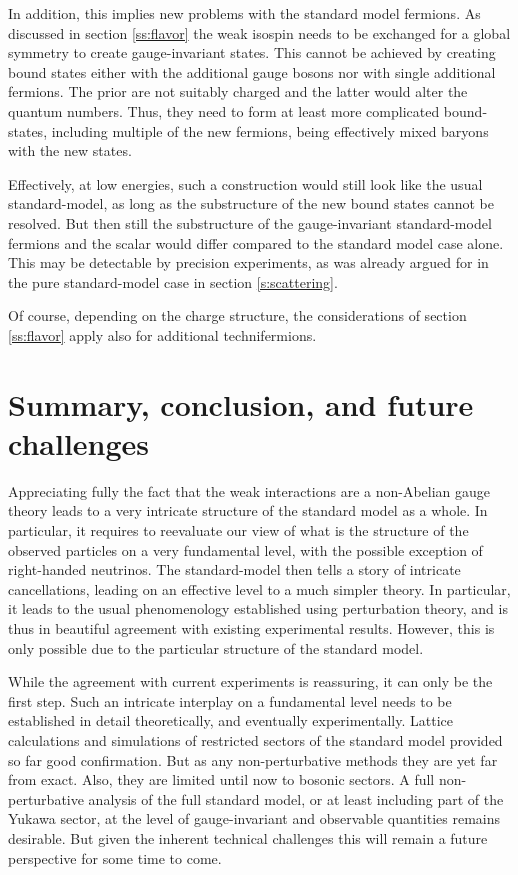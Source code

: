 \documentclass[final,12pt,3p,longtitle]{elsarticle}
\newcommand*{\1}{1\!\!\!\bot}
\begin{document}
In addition, this implies new problems with the standard model fermions. As discussed in section \ref{ss:flavor} the weak isospin needs to be exchanged for a global symmetry to create gauge-invariant states. This cannot be achieved by creating bound states either with the additional gauge bosons nor with single additional fermions. The prior are not suitably charged and the latter would alter the quantum numbers. Thus, they need to form at least more complicated bound-states, including multiple of the new fermions, being effectively mixed baryons with the new states.

Effectively, at low energies, such a construction would still look like the usual standard-model, as long as the substructure of the new bound states cannot be resolved. But then still the substructure of the gauge-invariant standard-model fermions and the scalar would differ compared to the standard model case alone. This may be detectable by precision experiments, as was already argued for in the pure standard-model case in section \ref{s:scattering}.

Of course, depending on the charge structure, the considerations of section \ref{ss:flavor} apply also for additional technifermions.

\section{Summary, conclusion, and future challenges}\label{s:sum}

Appreciating fully the fact that the weak interactions are a non-Abelian gauge theory leads to a very intricate structure of the standard model as a whole. In particular, it requires to reevaluate our view of what is the structure of the observed particles on a very fundamental level, with the possible exception of right-handed neutrinos. The standard-model then tells a story of intricate cancellations, leading on an effective level to a much simpler theory. In particular, it leads to the usual phenomenology established using perturbation theory, and is thus in beautiful agreement with existing experimental results. However, this is only possible due to the particular structure of the standard model.

While the agreement with current experiments is reassuring, it can only be the first step. Such an intricate interplay on a fundamental level needs to be established in detail theoretically, and eventually experimentally. Lattice calculations and simulations of restricted sectors of the standard model provided so far good confirmation. But as any non-perturbative methods they are yet far from exact. Also, they are limited until now to bosonic sectors. A full non-perturbative analysis of the full standard model, or at least including part of the Yukawa sector, at the level of gauge-invariant and observable quantities remains desirable. But given the inherent technical challenges this will remain a future perspective for some time to come.
\end{document}
